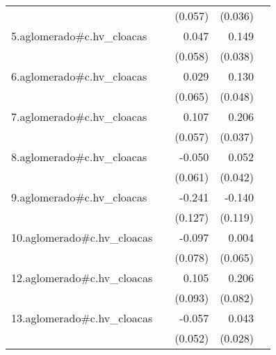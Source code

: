 {\begin{longtable}{l*{4}{D{.}{.}{-1}}}
            &                     &     (0.057)         &     (0.036)         &                     \\
\addlinespace
5.aglomerado#c.hv\_cloacas&                     &       0.047         &       0.149\sym{***}&                     \\
            &                     &     (0.058)         &     (0.038)         &                     \\
\addlinespace
6.aglomerado#c.hv\_cloacas&                     &       0.029         &       0.130\sym{**} &                     \\
            &                     &     (0.065)         &     (0.048)         &                     \\
\addlinespace
7.aglomerado#c.hv\_cloacas&                     &       0.107         &       0.206\sym{***}&                     \\
            &                     &     (0.057)         &     (0.037)         &                     \\
\addlinespace
8.aglomerado#c.hv\_cloacas&                     &      -0.050         &       0.052         &                     \\
            &                     &     (0.061)         &     (0.042)         &                     \\
\addlinespace
9.aglomerado#c.hv\_cloacas&                     &      -0.241         &      -0.140         &                     \\
            &                     &     (0.127)         &     (0.119)         &                     \\
\addlinespace
10.aglomerado#c.hv\_cloacas&                     &      -0.097         &       0.004         &                     \\
            &                     &     (0.078)         &     (0.065)         &                     \\
\addlinespace
12.aglomerado#c.hv\_cloacas&                     &       0.105         &       0.206\sym{*}  &                     \\
            &                     &     (0.093)         &     (0.082)         &                     \\
\addlinespace
13.aglomerado#c.hv\_cloacas&                     &      -0.057         &       0.043         &                     \\
            &                     &     (0.052)         &     (0.028)         &                     \\

\end{longtable}}
